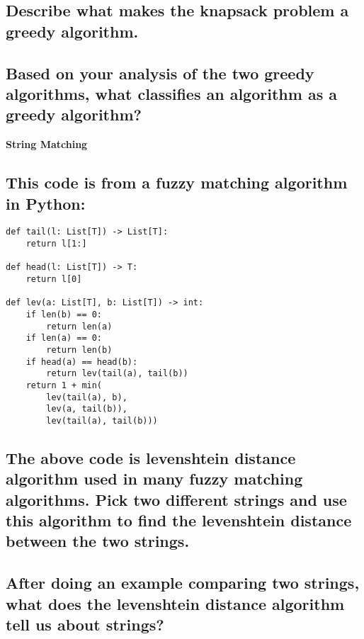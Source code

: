 \documentclass{article}
\begin{document}
\begin{itemize}
\subsection{Describe what makes the knapsack problem a greedy algorithm.}

\vspace{144pt}

\subsection{Based on your analysis of the two greedy algorithms, what classifies an algorithm as a greedy algorithm?}

\pagebreak{}

\begin{Large}
\item{\textbf{String Matching}}
\end{Large}

\subsection{This code is from a fuzzy matching algorithm in Python:}

\begin{lstlisting}
def tail(l: List[T]) -> List[T]:
    return l[1:]

def head(l: List[T]) -> T:
    return l[0]

def lev(a: List[T], b: List[T]) -> int:
    if len(b) == 0:
        return len(a)
    if len(a) == 0:
        return len(b)
    if head(a) == head(b):
        return lev(tail(a), tail(b))
    return 1 + min(
        lev(tail(a), b),
        lev(a, tail(b)),
        lev(tail(a), tail(b)))
\end{lstlisting}

\subsection{The above code is levenshtein distance algorithm used in many fuzzy matching algorithms. Pick two different strings and use this algorithm to find the levenshtein distance between the two strings. }

\vspace{72pt}

\subsection{After doing an example comparing two strings, what does the levenshtein distance algorithm tell us about strings?}

\pagebreak{}


\end{itemize}
\end{document}

